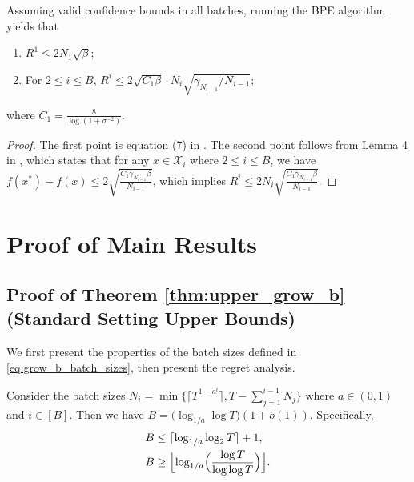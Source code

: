 \documentclass[10pt]{article}
\begin{document}
\begin{proposition}
    \label{prop:property_bpe}
    Assuming valid confidence bounds in all batches,
    running the BPE algorithm yields that
    \begin{enumerate}
        \item $R^1 \leq 2 N_1\sqrt{\beta}$;
        \item For $2 \leq i \leq B$, $R^i \leq 2\sqrt{C_1\beta} \cdot N_i\sqrt{\gamma_{N_{i-1}}/N_{i-1}} $;
    \end{enumerate}
    where $C_1 = \frac{8}{\log(1+\sigma^{-2})}$.
\end{proposition}
\begin{proof}
    The first point is equation (7) in \citep{Li22}.
    The second point follows from Lemma 4 in \citep{Li22}, which states that for any $x\in\mathcal{X}_i$ where $2\leq i\leq B$, we have $f(x^*) - f(x) \leq 2 \sqrt{\frac{C_1\gamma_{N_{i-1}}\beta}{N_{i-1}}}$, which implies
    $R^i \leq  2N_i \sqrt{\frac{C_1\gamma_{N_{i-1}}\beta}{N_{i-1}}}$.
\end{proof}

\section{Proof of Main Results}
\label{app:proof}
\subsection{Proof of Theorem \ref{thm:upper_grow_b} (Standard Setting Upper Bounds)}
\label{app:proof_thm_upper_grow_b}

We first present the properties of the batch sizes defined in \eqref{eq:grow_b_batch_sizes}, then present the regret analysis.

\begin{proposition}
    \label{prop:grow_b_batch_sizes_property}
    Consider the batch sizes $N_i = \min \bigl\{\lceil T^{1-a^i} \rceil, T-\sum_{j=1}^{i-1}N_j\bigr\}$ where $a\in(0,1)$ and $i\in [B]$. 
    Then we have $B = \bigl(\log_{1/a}\log T\bigr) (1+o(1)) $.
    Specifically,
    \begin{align}
        B & \leq \lceil \log_{1/a}\log_2 T \rceil + 1, \label{eq:B_upper_bound} \\
        B & \geq \Bigl\lfloor \log_{1/a}\Bigl(\frac{\log T}{\log\log T}\Bigr) \Bigr\rfloor. \label{eq:B_lower_bound}
    \end{align}
\end{proposition}
\end{document}
